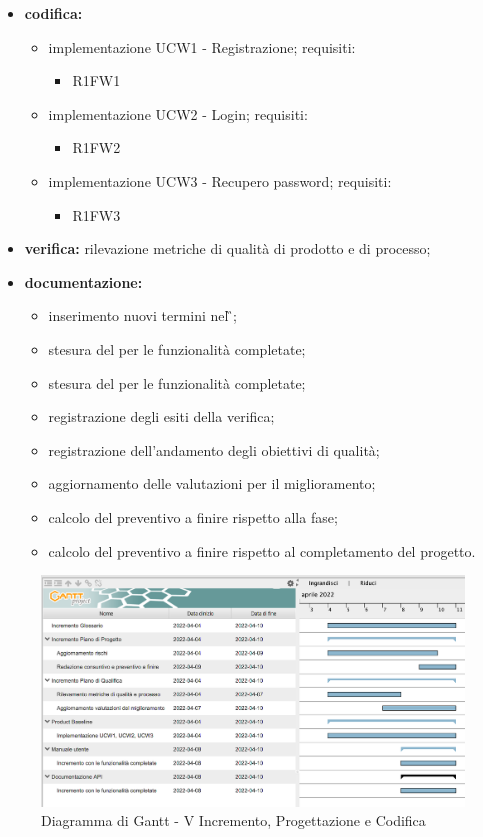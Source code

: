 \begin{itemize}
	\item \textbf{codifica:} 
			\begin{itemize}
				\item implementazione UCW1 - Registrazione; requisiti:
					\begin{itemize}
						\item R1FW1
					\end{itemize}
				\item implementazione UCW2 - Login; requisiti:
					\begin{itemize}
						\item R1FW2
					\end{itemize}
				\item implementazione UCW3 - Recupero password; requisiti:
					\begin{itemize}
						\item R1FW3
					\end{itemize}
			\end{itemize}
 	\item \textbf{verifica:} rilevazione metriche di qualità di prodotto e di processo;
	\item \textbf{documentazione:} 
	 \begin{itemize}
		\item inserimento nuovi termini nel \G{};
		\item stesura del \MU{} per le funzionalità completate;
		\item stesura del \MS{} per le funzionalità completate;
  		\item registrazione degli esiti della verifica;
     	\item registrazione dell’andamento degli obiettivi di qualità;
		\item aggiornamento delle valutazioni per il miglioramento; 
		\item calcolo del preventivo a finire rispetto alla fase;
		\item calcolo del preventivo a finire rispetto al completamento del progetto.
	 \end{itemize}
\end{itemize}
\begin{figure}[H]
	\centering
	\includegraphics[scale=0.45]{Sezioni/gantt/V_incremento.png}
	\caption{Diagramma di Gantt - V Incremento, Progettazione e Codifica}
\end{figure}

